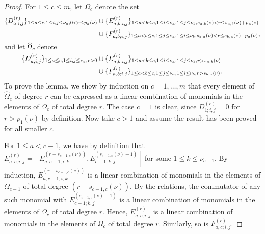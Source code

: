 \documentclass[twoside,12pt,reqno]{amsart}
\begin{document}
\begin{proof}
For $1 \leq  c \leq m$, let $\Omega_c$ denote the set
\begin{align*}
\{D_{a;i,j}^{(r)}\}_{1 \leq a \leq c, 
1 \leq i,j 
\leq \nu_a, 0 < r \leq p_a(\nu)}
&\cup
\{E_{a,b;i,j}^{(r)}\}_{1 \leq a < b \leq c,
1 \leq i \leq \nu_a, 1 \leq j \leq \nu_b, s_{a,b}(\nu) < r \leq
s_{a,b}(\nu)+p_a(\nu)}\\
&\cup\{F_{a,b;i,j}^{(r)}\}_{1 \leq a < b \leq c,
1 \leq j \leq \nu_a, 1 \leq i \leq \nu_b, s_{b,a}(\nu) < r \leq
s_{b,a}(\nu)+p_a(\nu)},\\\intertext{and 
let $\widehat\Omega_c$ denote}
\{D_{a;i,j}^{(r)}\}_{1 \leq a \leq c, 1 \leq i,j 
\leq \nu_a, r > 0}
&\cup
\{E_{a,b;i,j}^{(r)}\}_{1 \leq a < b \leq c,
1 \leq i \leq \nu_a, 1 \leq j \leq \nu_b, r > s_{a,b}(\nu)}\\
&\cup\{F_{a,b;i,j}^{(r)}\}_{1 \leq a < b \leq c,
1 \leq j \leq \nu_a, 1 \leq i \leq \nu_b, r > s_{b,a}(\nu)}.
\end{align*}
To prove the lemma, we show by induction on 
$c=1,\dots,m$ 
that every element
of ${\widehat \Omega}_c$ of degree $r$ can be expressed as a linear
combination of monomials in the elements of 
$\Omega_c$ of total
degree $r$. 
The case $c=1$ is clear, since
$D_{1;i,j}^{(r)} = 0$ for $r > p_1(\nu)$ by definition.
Now take $c > 1$ and assume the result has been proved for all smaller
$c$.

For $1 \leq a < c-1$, we have by definition that
$E_{a,c;i,j}^{(r)} = 
[E_{a,c-1;i,k}^{(r-s_{c-1,c}(\nu))}, 
E_{c-1;k,j}^{(s_{c-1,c}(\nu)+1)}]$ 
for some $1 \leq k \leq \nu_{c-1}$.
By induction, $E_{a,c-1;i,k}^{(r-s_{c-1,c}(\nu))}$ is a linear combination
of monomials in the elements of $\Omega_{c-1}$ of total degree
$(r-s_{c-1,c}(\nu))$. By the relations, the commutator of any such
monomial with $E_{c-1;k,j}^{(s_{c-1,c}(\nu)+1)}$ 
is a linear combination of monomials in the elements of $\Omega_c$
of total degree $r$. Hence, $E_{a,c;i,j}^{(r)}$
is a linear combination of monomials in the elements of $\Omega_c$
of total degree $r$.
Similarly, so is $F_{a,c;i,j}^{(r)}$.


\end{proof}
\end{document}
